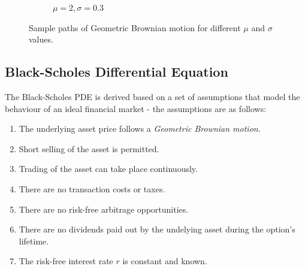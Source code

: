 \begin{figure}[H]
\begin{subfigure}[c]{0.495\textwidth}
        \caption{$\mu = 2, \sigma = 0.3$}
        \label{fig:gbm-sample-path-3}
    \end{subfigure}
    \caption{Sample paths of Geometric Brownian motion for different $\mu$ and $\sigma$ values.}
    \label{fig:gbm-sample-paths}
\end{figure}


\subsection{Black-Scholes Differential Equation}
The Black-Scholes PDE is derived based on a set of assumptions that model the behaviour of an ideal financial market - the assumptions are as follows:
\begin{enumerate}[(1)]
    \item The underlying asset price follows a \textit{Geometric Brownian motion}.
    \item Short selling of the asset is permitted.
    \item Trading of the asset can take place continuously.
    \item There are no transaction costs or taxes.
    \item There are no risk-free arbitrage opportunities.
    \item There are no dividends paid out by the undelying asset during the option's lifetime.
    \item The risk-free interest rate $r$ is constant and known.
\end{enumerate}

